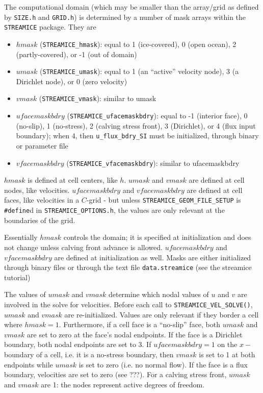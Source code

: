 The computational domain (which may be smaller than the array/grid as defined by
\texttt{SIZE.h} and \texttt{GRID.h}) is determined by a number of mask arrays 
within the \texttt{STREAMICE} package. They are 
\begin{itemize}
 \item $hmask$ (\texttt{STREAMICE\_hmask}): equal to 1 (ice-covered), 0 (open
ocean), 2 (partly-covered), or -1 (out of domain)
 \item $umask$ (\texttt{STREAMICE\_umask}): equal to 1 (an ``active'' velocity
node), 3 (a Dirichlet node), or 0 (zero velocity)
 \item $vmask$ (\texttt{STREAMICE\_vmask}): similar to umask
 \item $ufacemaskbdry$ (\texttt{STREAMICE\_ufacemaskbdry}): equal to -1
(interior face), 0 (no-slip), 1 (no-stress), 2 (calving stress front), 3
(Dirichlet), or 4 (flux input boundary); when 4, then \texttt{u\_flux\_bdry\_SI} must be initialized, through binary or parameter file
 \item $vfacemaskbdry$ (\texttt{STREAMICE\_vfacemaskbdry}): similar to
ufacemaskbdry
\end{itemize}
$hmask$ is defined at cell centers, like $h$. $umask$ and $vmask$ are defined at
cell nodes, like velocities. $ufacemaskbdry$ and $vfacemaskbdry$ are defined at 
cell faces, like velocities in a $C$-grid - but unless
\texttt{STREAMICE\_GEOM\_FILE\_SETUP} is \texttt{\#define}d in
\texttt{STREAMICE\_OPTIONS.h}, the values are only relevant at the boundaries of
the grid.

Essentially $hmask$ controls the domain; it is specified at initialization and does not change unless calving front advance is allowed.
$ufacemaskbdry$ and $vfacemaskbdry$ are defined at initialization as well. Masks are either initialized through binary files or through the text file \texttt{data.streamice} (see the streamice tutorial)

The values of $umask$ and $vmask$ determine which nodal values of $u$ and $v$ are involved in the solve for velocities. 
Before each call to \texttt{STREAMICE\_VEL\_SOLVE()}, $umask$ and $vmask$ are re-initialized. Values are only relevant if they border a cell where $hmask=1$.
Furthermore, if a cell face is a ``no-slip'' face, both $umask$ and $vmask$ are set to zero at the face's nodal endpoints.
If the face is a Dirichlet boundary, both nodal endpoints are set to 3. If $ufacemaskbdry=1$ on the $x-$boundary of a cell, i.e. it is a no-stress boundary, then 
$vmask$ is set to 1 at both endpoints while $umask$ is set to zero (i.e. no normal flow). If the face is a flux boundary, velocities are set to zero (see ???).
For a calving stress front, $umask$ and $vmask$ are 1: the nodes represent active degrees of freedom.

